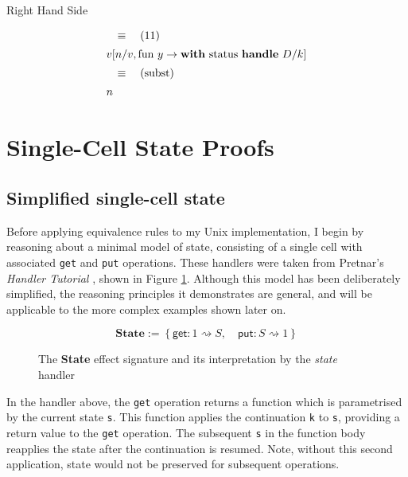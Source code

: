 \documentclass[logo,bsc,singlespacing,parskip]{infthesis}
\begin{document}
{Right Hand Side}

\[
\begin{array}{l}
\quad\equiv\quad (11) \\[5pt]
v [n/v, \text{fun } y \rightarrow \text{\textbf{with} status \textbf{handle} } D/k] \\[5pt]
\quad\equiv\quad (\text{subst}) \\[5pt]
n
\end{array}
\]





\section{Single-Cell State Proofs}

\subsection{Simplified single-cell state}

\label{subsec:simplified-state}
Before applying equivalence rules to my Unix implementation, I begin by reasoning about a minimal model of state, consisting of a single cell with associated \lstinline{get} and \lstinline{put} operations. These handlers were taken from Pretnar's \textit{Handler Tutorial} \cite{pretnar_introduction_2015}, shown in Figure \ref{fig:state-handler}. Although this model has been deliberately simplified, the reasoning principles it demonstrates are general, and will be applicable to the more complex examples shown later on.  

\begin{figure}
   
\[
\textbf{State} := \left\{
\mathsf{get} : 1 \rightsquigarrow S, \quad
\mathsf{put} : S \rightsquigarrow 1
\right\}
\]


\caption{The \textbf{State} effect signature and its interpretation by the \textit{state} handler}
\label{fig:state-handler}
\end{figure}

In the handler above, the \lstinline{get} operation returns a function which is parametrised by the current state \lstinline{s}. This function applies the continuation \lstinline{k}  to \lstinline{s}, providing a return value to the \lstinline{get} operation. The subsequent \lstinline{s} in the function body reapplies the state after the continuation is resumed. Note, without this second application, state would not be preserved for subsequent operations. 
\end{document}
